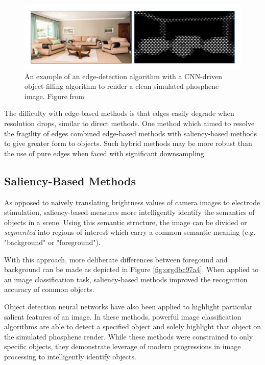 \documentclass[a4paper,11pt,openany]{book}
\begin{document}
\begin{figure}[htbp]
\centering
\includegraphics[width=.9\linewidth]{./graphics/litreview/edgeandfill.png}
\caption[Example of using an edge-detection algorithm to render a clean simulated phosphene image]{\label{fig:org3262cb7}
An example of an edge-detection algorithm with a CNN-driven object-filling algorithm to render a clean simulated phosphene image. Figure from \cite{sanchez-garcia_structural_2018}}
\end{figure}

The difficulty with edge-based methods is that edges easily degrade when resolution drops, similar to direct methods. \cite{buffoni_image_2005}
One method which aimed to resolve the fragility of edges combined edge-based methods with saliency-based methods to give greater form to objects. \cite{han_object_2015}
Such hybrid methods may be more robust than the use of pure edges when faced with significant downsampling.

\subsection*{Saliency-Based Methods}
\label{sec:org3fbc90b}

As opposed to naively translating brightness values of camera images to electrode stimulation, saliency-based measures more intelligently identify the semantics of objects in a scene.
Using this semantic structure, the image can be divided or \emph{segmented} into regions of interest which carry a common semantic meaning (e.g. "background" or "foreground"). \cite{pal_review_1993}

With this approach, more deliberate differences between foregound and background can be made as depicted in Figure \ref{fig:orgdbc97a4}. \cite{guo_optimization_2018}
When applied to an image classification task, saliency-based methods improved the recognition accuracy of common objects. \cite{han_object_2015,li_image_2018}

Object detection neural networks have also been applied to highlight particular salient features of an image. \cite{mace_simulated_2015}
In these methods, powerful image classification algorithms are able to detect a specified object and solely highlight that object on the simulated phosphene render.
While these methods were constrained to only specific objects, they demonstrate leverage of modern progressions in image processing to intelligently identify objects.
\end{document}
